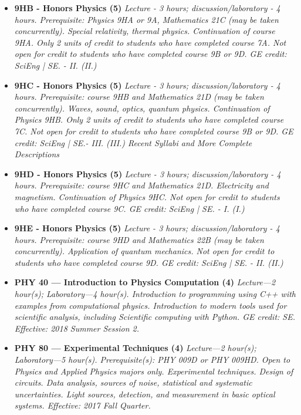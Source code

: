 \documentclass[12pt]{article}
\begin{document}
\begin{itemize}
\item {\bf 9HB - Honors Physics (5)}
{\it Lecture - 3 hours; discussion/laboratory - 4 hours. Prerequisite: Physics 9HA or 9A, Mathematics 21C (may be taken concurrently). Special relativity, thermal physics. Continuation of course 9HA. Only 2 units of credit to students who have completed course 7A. Not open for credit to students who have completed course 9B or 9D. GE credit: SciEng | SE. - II. (II.)}

\item {\bf 9HC - Honors Physics (5)}
{\it Lecture - 3 hours; discussion/laboratory - 4 hours. Prerequisite: course 9HB and Mathematics 21D (may be taken concurrently). Waves, sound, optics, quantum physics. Continuation of Physics 9HB. Only 2 units of credit to students who have completed course 7C. Not open for credit to students who have completed course 9B or 9D. GE credit: SciEng | SE.- III. (III.)
Recent Syllabi and More Complete Descriptions}

\item {\bf 9HD - Honors Physics (5)}
{\it Lecture - 3 hours; discussion/laboratory - 4 hours. Prerequisite: course 9HC and Mathematics 21D. Electricity and magnetism. Continuation of Physics 9HC. Not open for credit to students who have completed course 9C. GE credit: SciEng | SE. - I. (I.)}

\item {\bf 9HE - Honors Physics (5)}
{\it Lecture - 3 hours; discussion/laboratory - 4 hours. Prerequisite: course 9HD and Mathematics 22B (may be taken concurrently). Application of quantum mechanics. Not open for credit to students who have completed course 9D. GE credit: SciEng | SE. - II. (II.)}

\item {\bf PHY 40 — Introduction to Physics Computation (4)}
{\it Lecture—2 hour(s); Laboratory—4 hour(s). Introduction to programming using C++ with examples from computational physics. Introduction to modern tools used for scientific analysis, including Scientific computing with Python. GE credit: SE. Effective: 2018 Summer Session 2.}

\item {\bf PHY 80 — Experimental Techniques (4)}
{\it Lecture—2 hour(s); Laboratory—5 hour(s). Prerequisite(s): PHY 009D or PHY 009HD. Open to Physics and Applied Physics majors only. Experimental techniques. Design of circuits. Data analysis, sources of noise, statistical and systematic uncertainties. Light sources, detection, and measurement in basic optical systems. Effective: 2017 Fall Quarter.}

\end{itemize}
\end{document}
